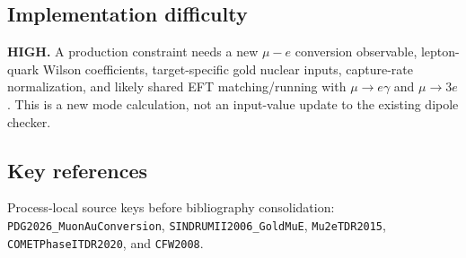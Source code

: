 \subsection*{Implementation difficulty}
\textbf{HIGH.}  A production constraint needs a new \(\mu-e\) conversion
observable, lepton-quark Wilson coefficients, target-specific gold nuclear
inputs, capture-rate normalization, and likely shared EFT matching/running
with \(\mu\to e\gamma\) and \(\mu\to3e\).  This is a new mode calculation, not
an input-value update to the existing dipole checker.

\subsection*{Key references}
Process-local source keys before bibliography consolidation:
\texttt{PDG2026\_MuonAuConversion}, \texttt{SINDRUMII2006\_GoldMuE},
\texttt{Mu2eTDR2015}, \texttt{COMETPhaseITDR2020}, and \texttt{CFW2008}.
